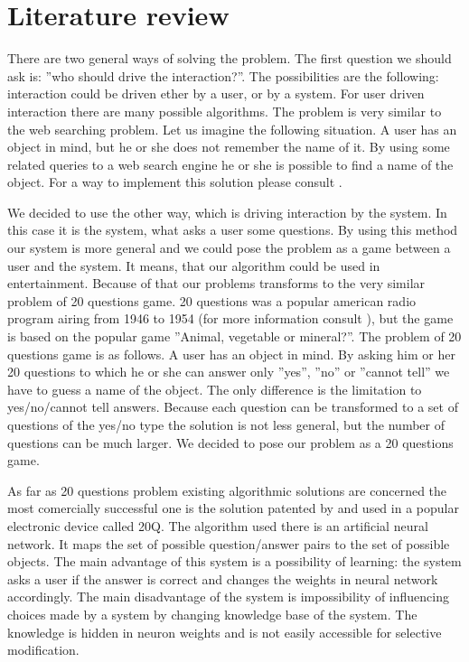 \documentclass[a4paper]{article}
\begin{document}
\section{Literature review}
There are two general ways of solving the problem. The first question we should ask is: ''who should drive the interaction?''. The possibilities are the following: interaction could be driven ether by a user, or by a system. For user driven interaction there are many possible algorithms. The problem is very similar to the web searching problem. Let us imagine the following situation. A user has an object in mind, but he or she does not remember the name of it. By using some related queries to a web search engine he or she is possible to find a name of the object. For a way to implement this solution please consult \citet{Google}.

We decided to use the other way, which is driving interaction by the system. In this case it is the system, what asks a user some questions. By using this method our system is more general and we could pose the problem as a game between a user and the system. It means, that our algorithm could be used in entertainment. Because of that our problems transforms to the very similar problem of 20 questions game. 20 questions was a popular american radio program airing from 1946 to 1954 (for more information consult \citet{Radio}), but the game is based on the popular game ''Animal, vegetable or mineral?''. The problem of 20 questions game is as follows. A user has an object in mind. By asking him or her 20 questions to which he or she can answer only ''yes'', ''no'' or ''cannot tell'' we have to guess a name of the object. The only difference is the limitation to yes/no/cannot tell answers. Because each question can be transformed to a set of questions of the yes/no type the solution is not less general, but the number of questions can be much larger. We decided to pose our problem as a 20 questions game. 

As far as 20 questions problem existing algorithmic solutions are concerned the most comercially successful one is the solution patented by \citet{20Q} and used in a popular electronic device called 20Q. The algorithm used there is an artificial neural network. It maps the set of possible question/answer pairs to the set of possible objects. The main advantage of this system is a possibility of learning: the system asks a user if the answer is correct and changes the weights in neural network accordingly. The main disadvantage of the system is impossibility of influencing choices made by a system by changing knowledge base of the system. The knowledge is hidden in neuron weights and is not easily accessible for selective modification.
\end{document}
